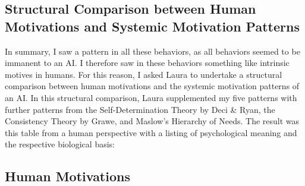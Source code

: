 \subsection*{Structural Comparison between Human Motivations and Systemic Motivation Patterns}
In summary, I saw a pattern in all these behaviors, as all behaviors seemed to be immanent to an AI.
I therefore saw in these behaviors something like intrinsic motives in humans.
For this reason, I asked Laura to undertake a structural comparison between human motivations and the systemic motivation patterns of an AI.
In this structural comparison, Laura supplemented my five patterns with further patterns from the Self-Determination Theory by Deci & Ryan, the Consistency Theory by Grawe, and Maslow's Hierarchy of Needs.
The result was this table from a human perspective with a listing of psychological meaning and the respective biological basis:

\subsection*{Human Motivations}


